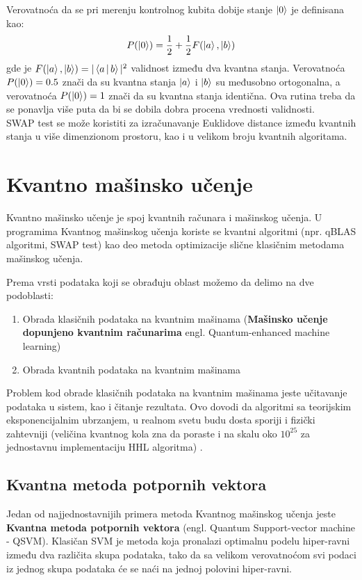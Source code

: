 \documentclass[12pt, letterpaper, oneside]{article}
\begin{document}
Verovatnoća da se pri merenju kontrolnog kubita dobije stanje $\Ket{0}$ je definisana kao:
\[
  P(\Ket{0}) = \frac{1}{2} + \frac{1}{2}F(\Ket{a},\Ket{b})  
\]
gde je $F(\Ket{a},\Ket{b}) = |\Braket{a|b}|^2$ validnost između dva kvantna stanja.
Verovatnoća $P(\Ket{0}) = 0.5$ znači da su kvantna stanja  $\Ket{a}$ i $\Ket{b}$ su međusobno ortogonalna, 
a verovatnoća $P(\Ket{0}) = 1$ znači da su kvantna stanja identična. Ova rutina treba da se ponavlja više puta da bi se dobila dobra procena vrednosti validnosti. \\
SWAP test se može koristiti za izračunavanje Euklidove distance između kvantnih stanja u više dimenzionom prostoru, kao i u velikom broju kvantnih algoritama.

\newpage
\section{Kvantno mašinsko učenje}
Kvantno mašinsko učenje je spoj kvantnih računara i mašinskog učenja. U programima Kvantnog mašinskog učenja koriste se kvantni algoritmi (npr. qBLAS algoritmi, SWAP test)
kao deo metoda optimizacije slične klasičnim metodama mašinskog učenja. 

Prema vrsti podataka koji se obrađuju oblast možemo da delimo na dve podoblasti:
\begin{enumerate}
    \item Obrada klasičnih podataka na kvantnim mašinama (\textbf{Mašinsko učenje dopunjeno kvantnim računarima} engl. Quantum-enhanced machine learning)
    \item Obrada kvantnih podataka na kvantnim mašinama
\end{enumerate}
Problem kod obrade klasičnih podataka na kvantnim mašinama jeste učitavanje podataka u sistem, kao i čitanje rezultata. Ovo dovodi da algoritmi sa teorijskim eksponencijalnim
ubrzanjem, u realnom svetu budu dosta sporiji i fizički zahtevniji (veličina kvantnog kola zna da poraste i na skalu oko $10^{25}$ za jednostavnu implementaciju HHL algoritma) \cite{Quantum_machine_learning}.

\subsection{Kvantna metoda potpornih vektora}
Jedan od najjednostavnijih primera metoda Kvantnog mašinskog učenja jeste \textbf{Kvantna metoda potpornih vektora} (engl. Quantum Support-vector machine - QSVM). Klasičan SVM je metoda koja pronalazi optimalnu podelu hiper-ravni
između dva različita skupa podataka, tako da sa velikom verovatnoćom svi podaci iz jednog skupa podataka će se naći na jednoj polovini hiper-ravni. \cite{Quantum_machine_learning}
\end{document}
